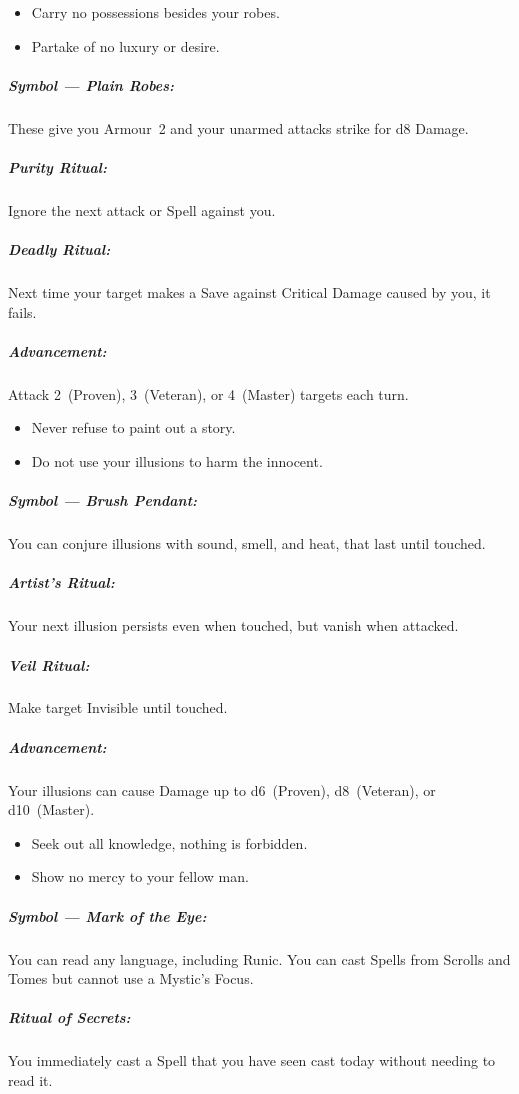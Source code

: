 \documentclass[itdr/core]{subfiles}
\begin{document}
\creedskip

{\em\begin{itemize}
		\item Carry no possessions besides your robes.
		\item Partake of no luxury or desire.
\end{itemize}}

\subparagraph{Symbol --- Plain Robes:} These give you Armour~2 and your unarmed attacks strike for d8 Damage.

\subparagraph{Purity Ritual:} Ignore the next attack or Spell against you.

\subparagraph{Deadly Ritual:} Next time your target makes a Save against Critical Damage caused by you, it fails.

\subparagraph{Advancement:} Attack 2~(Proven), 3~(Veteran), or 4~(Master) targets each turn.

\break

{\em\begin{itemize}
		\item Never refuse to paint out a story.
		\item Do not use your illusions to harm the innocent.
\end{itemize}}

\subparagraph{Symbol --- Brush Pendant:} You can conjure illusions with sound, smell, and heat, that last until touched.

\subparagraph{Artist's Ritual:} Your next illusion persists even when touched, but vanish when attacked.

\subparagraph{Veil Ritual:} Make target Invisible until touched.

\subparagraph{Advancement:} Your illusions can cause Damage up to d6~(Proven), d8~(Veteran), or d10~(Master).

\creedskip

{\em\begin{itemize}
		\item Seek out all knowledge, nothing is forbidden.
		\item Show no mercy to your fellow man.
\end{itemize}}

\subparagraph{Symbol --- Mark of the Eye:} You can read any language, including Runic. You can cast Spells from Scrolls and Tomes but cannot use a Mystic's Focus.

\subparagraph{Ritual of Secrets:} You immediately cast a Spell that you have seen cast today without needing to read it.
\end{document}
